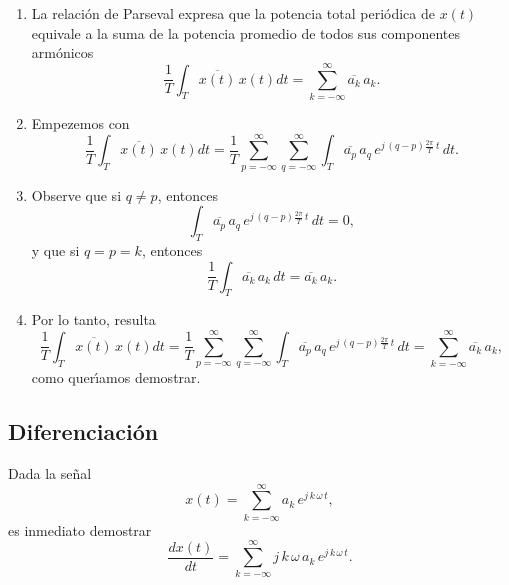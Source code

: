 \begin{enumerate}

\item La relaci\'{o}n de Parseval expresa que la potencia total
peri\'{o}dica de $x(t)$ equivale a la suma de la potencia promedio de
todos sus componentes arm\'{o}nicos
\begin{equation}
\frac{1}{T} \int_{T} \overline{x(t)} \, x(t) dt = 
\sum_{k=-\infty }^{\infty } \overline{a_{k}} \, a_{k}.
\end{equation}

\item Empezemos con
\begin{equation}
\frac{1}{T} \int_{T} \overline{x(t)} \, x(t) dt = 
\frac{1}{T} \sum_{p = -\infty}^{\infty} \sum_{q = -\infty}^{\infty} 
\int_{T} \overline{a_{p}} \, a_{q} \, e^{j \, \left(q - p \right) \frac{2 \pi}{T} \, t} \, dt.
\end{equation}

\item Observe que si $q \neq p$, entonces
\begin{equation}
\int_{T} \overline{a_{p}} \, a_{q} \, e^{j \, \left(q - p \right)
  \frac{2 \pi}{T} \, t} \, dt = 0,
\end{equation}
 y que si $q = p = k$, entonces
\begin{equation}
\frac{1}{T} \int_{T} \overline{a_{k}} \, a_{k} \, dt =
\overline{a_{k}} \, a_{k}.
\end{equation}

\item Por lo tanto, resulta
\begin{equation}
\frac{1}{T} \int_{T} \overline{x(t)} \, x(t) dt = 
\frac{1}{T} \sum_{p = -\infty}^{\infty} \sum_{q = -\infty}^{\infty} 
\int_{T} \overline{a_{p}} \, a_{q} \, e^{j \, \left(q - p \right)
  \frac{2 \pi}{T} \, t} \, dt = 
\sum_{k = -\infty}^{\infty} \overline{a_{k}} \, a_{k},
\end{equation}
como quer\'{\i}amos demostrar.
\end{enumerate}

\subsection{Diferenciaci\'{o}n}

Dada la se\~{n}al 
\begin{equation}
x(t) = \sum_{k=-\infty }^{\infty } a_{k} \, e^{j \, k \, \omega \, t},
\end{equation}
es inmediato demostrar
\begin{equation}
\frac{dx\left( t\right) }{dt}=\sum_{k=-\infty }^{\infty } j \, k \,
\omega \, a_{k} \, e^{j \, k \, \omega \, t}.
\end{equation}

